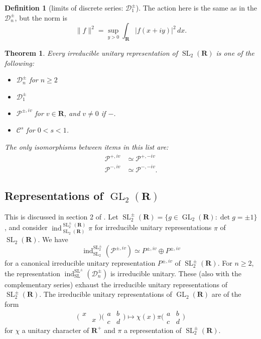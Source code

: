 \documentclass{article}
\DeclareMathOperator{\generallinear}{GL}
\DeclareMathOperator{\induce}{ind}
\DeclareMathOperator{\speciallinear}{SL}
\newcommand{\dR}{\mathbf{R}}
\newcommand{\complementaryseries}{\mathcal{C}}
\newcommand{\discreteseries}{\mathcal{D}}
\newcommand{\principalseries}{\mathcal{P}}
\newcommand{\smat}[4]{\bigl(\begin{smallmatrix} {#1} & {#2} \\ {#3} & {#4} \end{smallmatrix} \bigr)}
\newtheorem{theorem}[subsubsection]{Theorem}
\theoremstyle{definition}
\newtheorem{definition}[subsubsection]{Definition}
\begin{document}
\begin{definition}[limits of discrete series: $\discreteseries_1^{\pm}$]
The action here is the same as in the $\discreteseries_n^\pm$, but the norm is 
\[
  \|f\|^2 = \sup_{y>0} \int_\dR |f(x+i y)|^2\, dx .
\]
\end{definition}


\begin{theorem}
Every irreducible unitary representation of $\speciallinear_2(\dR)$ is one 
of the following:
\begin{itemize}
  \item $\discreteseries_n^\pm$ for $n\geqslant 2$
  \item $\discreteseries_1^\pm$
  \item $\principalseries^{\pm, i v}$ for $v\in \dR$, and $v\ne 0$ if $-$. 
  \item $\complementaryseries^s$ for $0<s<1$. 
\end{itemize}
The only isomorphisms between items in this list are: 
\begin{align*}
  \principalseries^{+, i v} &\simeq \principalseries^{+, -i v} \\
  \principalseries^{-, i v} &\simeq \principalseries^{-,-i v} .
\end{align*}
\end{theorem}


\subsection{Representations of \texorpdfstring{$\generallinear_2(\dR)$}{GL2R}}

This is discussed in section 2 of \cite{kn79}. 
Let $\speciallinear_2^\pm(\dR)=\{g\in \generallinear_2(\dR):\det g=\pm 1\}$, 
and consider $\induce_{\speciallinear_2(\dR)}^{\speciallinear_2^\pm(\dR)}\pi$ for 
irreducible unitary representations $\pi$ of $\speciallinear_2(\dR)$. We have 
\[
  \induce_{\speciallinear_2}^{\speciallinear_2^\pm}(\principalseries^{\pm, i v}) \simeq P^{\pm, i v}\oplus P^{\pm , i v}
\]
for a canonical irreducible unitary representation $P^{\pm, i v}$ of 
$\speciallinear_2^\pm(\dR)$. For $n\geqslant 2$, the representation 
$\induce_{\speciallinear}^{\speciallinear^\pm}(\discreteseries_n^\pm)$ is 
irreducible unitary. These (also with the complementary series) exhaust the 
irreducible unitary representations of $\speciallinear_2^\pm(\dR)$. The 
irreducible unitary representations of $\generallinear_2(\dR)$ are of the 
form 
\[
  \smat{x}{}{}{x} \smat a b c d \mapsto \chi(x)\pi\smat a b c d
\]
for $\chi$ a unitary character of $\dR^+$ and $\pi$ a representation of 
$\speciallinear_2^\pm(\dR)$. 
\end{document}
